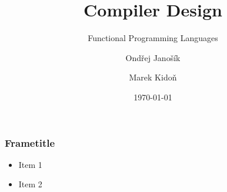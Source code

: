 \documentclass{beamer}
\title{Compiler Design}
\subtitle{Functional Programming Languages}
\author[Ondřej Janošík \and Marek Kidoň]{Ondřej Janošík \and Marek Kidoň}
\institute{Faculty of Information Technology, Brno University of Technology}
\date{\today}
\begin{document}
\frame{\maketitle}

\begin{frame} \frametitle{Frametitle}

  \begin{itemize}
    \item Item 1
    \item Item 2
  \end{itemize}

\end{frame}
\end{document}
